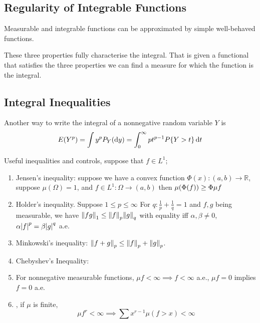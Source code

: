 \subsection{Regularity of Integrable Functions}
    
\begin{thm}
    Measurable and integrable functions can be approximated by simple well-behaved functions.   
\end{thm}
\begin{thm}
    
\end{thm}

\begin{remark}
    These three properties fully characterise the integral. That is given a functional that satisfies the three properties we can find a measure for which the function is the integral. 
\end{remark}

\subsection{Integral Inequalities}

\begin{lemma}
    Another way to write the integral of a nonnegative random variable \(Y\) is 
    \begin{equation*}
        E(Y^{p})= \int y^{p} P_{Y}(\dd{y}) = \int_{0}^{\infty} pt^{p-1}P\Bqty{Y > t} \dd{t}
    \end{equation*}
\end{lemma}

\begin{thm}
    Useful inequalities and controls, suppose that \(f \in L^{1}\);
    \begin{enumerate}
        \item Jensen's inequality: suppose we have a convex function \(\Phi(x): (a,b) \to \mathbb{R}\), suppose \(\mu(\Omega)=1\), and \(f \in L^{1}: \Omega \to (a,b) \) then \(\mu\pqty{\Phi(f)} \geq \Phi \mu f\)
        \item Holder's inequality. Suppose \(1 \leq p \leq \infty\) For \(q: \frac{1}{p} + \frac{1}{q} = 1\) and \(f,g\) being measurable, we have \(\norm{fg}_{1} \leq \norm{f}_{p} \norm{g}_{q}\) with equality iff \(\alpha, \beta \neq 0\), \(\alpha \abs{f}^{p} = \beta \abs{g}^{q}\) a.e. 
        \item Minkowski's inequality: \(\norm{f + g}_{p} \leq \norm{f}_{p} + \norm{g}_{p}\).
        \item Chebyshev's Inequality: 
        \item For nonnegative measurable functions, \(\mu f < \infty  \implies f < \infty\) a.e., \(\mu f = 0\) implies \(f = 0\) a.e. 
        \item {}, if \(\mu\) is finite, 
        \begin{equation*}
            \mu f^{r} < \infty \implies \sum x^{r - 1} \mu(f> x) < \infty
        \end{equation*}
    \end{enumerate}    
\end{thm}

